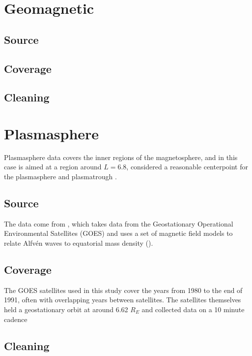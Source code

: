 \section{Geomagnetic}

\subsection{Source}

\subsection{Coverage}

\subsection{Cleaning}

\section{Plasmasphere}
Plasmasphere data covers the inner regions of the magnetosphere, and in this case is aimed at a region around $L=6.8$, considered a reasonable centerpoint for the plasmasphere and plasmatrough .

\subsection{Source}
The data come from \cite{Takahashi2010SolarCycleVariation}, which takes data from the Geostationary Operational Environmental Satellites (GOES) and uses a set of magnetic field models to relate Alfvén waves to equatorial mass density (\req). 

\subsection{Coverage}
The GOES satellites  used in this study cover the years from 1980 to the end of 1991, often with overlapping years between satellites. The satellites themselves held a geostationary orbit at around 6.62 $R_E$ and collected data on a 10 minute cadence  

\subsection{Cleaning}